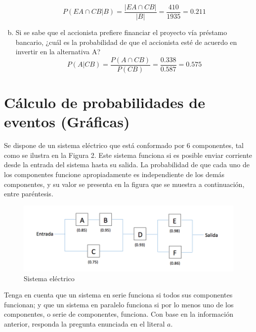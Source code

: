 \documentclass[11pt, spanish]{article}
\begin{document}
\begin{enumerate}[(a)]
$$P(EA \cap CB | B) = \frac{\left| EA \cap CB \right|}{\left| B \right|} =  \frac{410}{1935} =  0.211$$

\item Si se sabe que el accionista prefiere financiar el proyecto vía préstamo bancario, ¿cuál es la probabilidad de que el accionista esté de acuerdo en invertir en la alternativa A?\\

$$P(A | CB) = \frac{P(A \cap CB)}{P(CB)} =  \frac{0.338}{0.587} =  0.575$$
\end{enumerate}

\section{Cálculo de probabilidades de eventos (Gráficas)}

Se dispone de un sistema eléctrico que está conformado por 6 componentes, tal como se ilustra en la Figura 2. Este sistema funciona si es posible enviar corriente desde la entrada del sistema hasta su salida. La probabilidad de que cada uno de los componentes funcione apropiadamente es independiente de los demás componentes, y su valor se presenta en la figura que se muestra a continuación, entre paréntesis.

\begin{figure}[h]
\centering
	\includegraphics[scale=0.8]{circuit.png}
	\caption{Sistema eléctrico}
\end{figure}

Tenga en cuenta que un sistema en serie funciona si todos sus componentes funcionan; y que un sistema en paralelo funciona si por lo menos uno de los componentes, o serie de componentes, funciona. Con base en la información anterior, responda la pregunta enunciada en el literal $a$.
\end{document}
